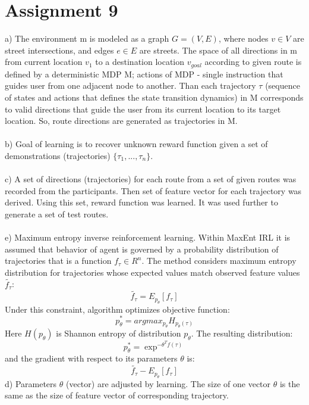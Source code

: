 \documentclass{article}
\begin{document}
\section*{Assignment 9}

a) The environment m is modeled as a graph $G=(V,E)$, where nodes $v\in V$ are street intersections, and edges $e\in E$ are streets.
The space of all directions in m from current location $v_{1}$ to a destination location $v_{goal}$ according to given route is defined by a deterministic MDP M; actions of MDP - single instruction that guides user from one adjacent node to another. Than each trajectory $\tau$ (sequence of states and actions that defines the state transition dynamics) in M corresponds to valid directions that guide the user from its current location to its target location. So, route directions are generated as trajectories in M.\\
\\b) Goal of learning is to recover unknown reward function given a set of demonstrations (trajectories) $\{\tau_{1}, . . . ,\tau_{n}\}$.\\
\\c) A set of directions (trajectories) for each route from a set of given routes was recorded from the participants. Then set of feature vector for each trajectory was derived. Using this set, reward function was learned. It was used further to generate a set of test routes.\\
\\e) Maximum entropy inverse reinforcement learning. Within MaxEnt
IRL it is assumed that behavior of agent is governed by a probability distribution of trajectories that is a function $f_{\tau}\in R^{n}$. The method considers maximum entropy distribution for trajectories whose expected values match observed feature values $\widetilde{f_{\tau}}$:
$$\widetilde{f_{\tau}}=E_{p_{\theta}}[f_{\tau}]$$
Under this constraint, algorithm optimizes objective function:
$$p_{\theta}^{*}=argmax_{p_{\theta}}H_{p_{\theta}(\tau)}$$
Here $H(p_{\theta})$ is Shannon entropy of distribution $p_{\theta}$. The resulting distribution:
$$p_{\theta}^{*}=\exp^{-\theta^{T}f(\tau)}$$
and the gradient with respect to its parameters $\theta$ is:
$$\widetilde{f_{\tau}}-E_{p_{\theta}}[f_{\tau}]$$
d) Parameters $\theta$ (vector) are adjusted by learning. The size of one vector $\theta$ is the same as the size of feature vector of corresponding trajectory.
\end{document}
